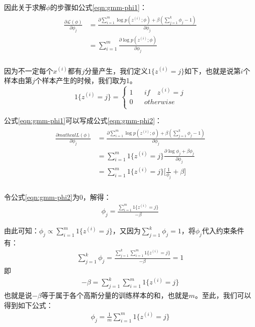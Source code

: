 因此关于求解$\phi$的步骤如公式\ref{eqn:gmm-phi1}：
\begin{align}
\label{eqn:gmm-phi1}
\begin{split}
  \frac{\partial \mathcal{L}(\phi)}{\partial \phi_j}
  &=\frac{\partial \sum_{i=1}^{m} \log p(z^{(i)};\phi) + \beta(\sum_{j=1}^{k} \phi_{j}-1)}{\partial \phi_j} \\
  &= \sum_{i=1}^{m} \frac{\partial \log p(z^{(i)};\phi)}{\partial \phi_j} \\
\end{split}
\end{align}

因为不一定每个$x^{(i)}$都有$j$分量产生，我们定义$1\{z^{(i)}=j\}$如下，也就是说第$i$个样本由第$j$个样本产生的时候，我们取为1。
\begin{equation}
1\{z^{(i)}=j\}=\left\{
\begin{array}{rcl}
1& & if \quad z^{(i)}=j\\
0 & & otherwise\\
\end{array} \right.
\end{equation}

公式\ref{eqn:gmm-phi1}可以写成公式\ref{eqn:gmm-phi2}：
\begin{align}
\label{eqn:gmm-phi2}
\begin{split}
  \frac{\partial mathcal{L}(\phi)}{\partial \phi_j}
  &=\frac{\partial \sum_{i=1}^{m} \log p(z^{(i)};\phi) + \beta(\sum_{j=1}^{k} \phi_{j}-1)}{\partial \phi_j} \\
  &= \sum_{i=1}^{m} 1\{z^{(i)}=j\} \frac{\partial \log \phi_j + \beta{\phi_{j}}}{\partial \phi_j} \\
  &= \sum_{i=1}^{m} 1\{z^{(i)}=j\} \Big[ \frac{1}{\phi_j} + \beta \Big]\\
\end{split}
\end{align}

令公式\ref{eqn:gmm-phi2}为0，解得：
\begin{align}
  \phi_j = \frac{\sum_{i=1}^{m} 1\{z^{(i)}=j\}}{-\beta}
\end{align}

由此可知：$\phi_j \propto \sum_{i=1}^{m} 1\{z^{(i)}=j\}$，又因为$\sum_{j=1}^{k} \phi_{j}=1$，将$\phi_j$代入约束条件有：
\begin{align}
  \sum_{j=1}^{k} \phi_j = \frac{ \sum_{j=1}^{k} \sum_{i=1}^{m} 1\{z^{(i)}=j\}}{-\beta} =1
\end{align}
即
\begin{align}
  -\beta = \sum_{j=1}^{k} \sum_{i=1}^{m} 1\{z^{(i)}=j\}
\end{align}
也就是说$-\beta$等于属于各个高斯分量的训练样本的和，也就是$m$。至此，我们可以得到如下公式：
\begin{align}
  \phi_j = \frac{1}{m}\sum_{i=1}^{m} 1\{z^{(i)}=j\}
\end{align}

